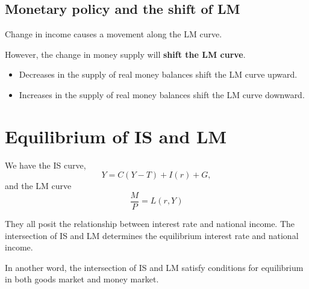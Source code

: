 \documentclass[10pt]{article}
\begin{document}
\subsection{Monetary policy and the shift of LM}
Change in income causes a movement along the LM curve.

However, the change in money supply will {\textbf {shift the LM curve}}.

\begin{figure}[H]
\end{figure}


\begin{itemize}
\item Decreases in the supply of real money balances shift the LM curve upward.
\item Increases in the supply of real money balances shift the LM curve downward.
\end{itemize}





\section{Equilibrium of IS and LM}
We have the IS curve,
\begin{equation*}
Y = C(Y - T) + I(r) + G,
\end{equation*}
and the LM curve
\begin{equation*}
\frac{M}{P} = L(r, Y)
\end{equation*}

They all posit the relationship between interest rate and national income. The 
intersection of IS and LM determines the equilibrium interest rate and national income. 

In another word, the intersection of IS and LM satisfy conditions for equilibrium in
both goods market and money market.
\end{document}
